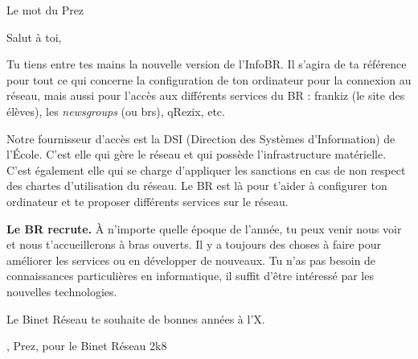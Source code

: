 
\begin{center}
    { \Huge Le mot du Prez }
\end{center}

\indent \indent Salut \`a toi,

Tu tiens entre tes mains la nouvelle version de l'InfoBR. Il s'agira de ta r\'ef\'erence pour tout ce qui concerne la configuration de ton ordinateur pour la connexion au r\'eseau, mais aussi pour l'acc\`es aux diff\'erents services du BR : frankiz (le site des \'el\`eves), les \emph{newsgroups} (ou brs), qRezix, etc.

Notre fournisseur d'acc\`es est la DSI (Direction des Syst\`emes d'Information) de l'\'Ecole. C'est elle qui g\`ere le r\'eseau et qui poss\`ede l'infrastructure mat\'erielle. C'est \'egalement elle qui se charge d'appliquer les sanctions en cas de non respect des chartes d'utilisation du r\'eseau. Le BR est l\`a pour t'aider \`a configurer ton ordinateur et te proposer diff\'erents services sur le r\'eseau.

\textbf{Le BR recrute.} \`A n'importe quelle \'epoque de l'ann\'ee, tu peux venir nous voir et nous t'accueillerons \`a bras ouverts. Il y a toujours des choses \`a faire pour am\'eliorer les services ou en d\'evelopper de nouveaux. Tu n'as pas besoin de connaissances particuli\`eres en informatique, il suffit d'\^etre int\'eress\'e par les nouvelles technologies.

Le Binet R\'eseau te souhaite de bonnes ann\'ees \`a l'X.\\

\begin{flushright}
    , Prez, pour le Binet R\'eseau 2k8 
\end{flushright}

